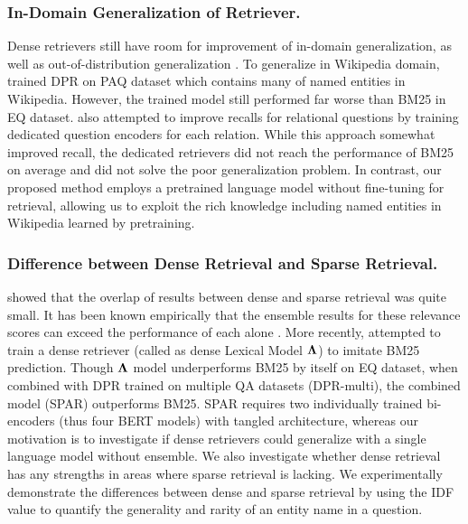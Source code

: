 \documentclass[letterpaper]{article} \usepackage{aaai23}  \usepackage{times}  \usepackage{helvet}  \usepackage{courier}  \usepackage[hyphens]{url}  \usepackage{graphicx} \urlstyle{rm} \def\UrlFont{\rm}  \usepackage{natbib}  \usepackage{caption} \frenchspacing  \setlength{\pdfpagewidth}{8.5in}  \setlength{\pdfpageheight}{11in}  \usepackage{algorithm}
\begin{document}
\subsubsection{In-Domain Generalization of Retriever.}
Dense retrievers still have room for improvement of in-domain generalization, as well as out-of-distribution generalization \citep{thakur2021beir}.
To generalize in Wikipedia domain, \citet{sciavolino-etal-2021-simple} trained DPR on PAQ dataset \citep{lewis-etal-2021-paq} which contains many of named entities in Wikipedia.
However, the trained model still performed far worse than BM25 in EQ dataset.
\citet{sciavolino-etal-2021-simple} also attempted to improve recalls for relational questions by training dedicated question encoders for each relation.
While this approach somewhat improved recall, the dedicated retrievers did not reach the performance of BM25 on average and did not solve the poor generalization problem.
In contrast, our proposed method employs a pretrained language model without fine-tuning for retrieval, allowing us to exploit the rich knowledge including named entities in Wikipedia learned by pretraining.

\subsubsection{Difference between Dense Retrieval and Sparse Retrieval.}
\citet{replication_dpr} showed that the overlap of results between dense and sparse retrieval was quite small.
It has been known empirically that the ensemble results for these relevance scores can exceed the performance of each alone \citep[e.g.,][]{karpukhin-etal-2020-dense}.
More recently, \citet{Chen2021SalientPA} attempted to train a dense retriever (called as dense Lexical Model $\bf{\Lambda}$) to imitate BM25 prediction.
Though $\bf{\Lambda}$ model underperforms BM25 by itself on EQ dataset, when combined with DPR trained on multiple QA datasets (DPR-multi), the combined model (SPAR) outperforms BM25.
SPAR requires two individually trained bi-encoders (thus four BERT models) with tangled architecture, whereas our motivation is to investigate if dense retrievers could generalize with a single language model without ensemble.
We also investigate whether dense retrieval has any strengths in areas where sparse retrieval is lacking.
We experimentally demonstrate the differences between dense and sparse retrieval by using the IDF value to quantify the generality and rarity of an entity name in a question.
\end{document}
